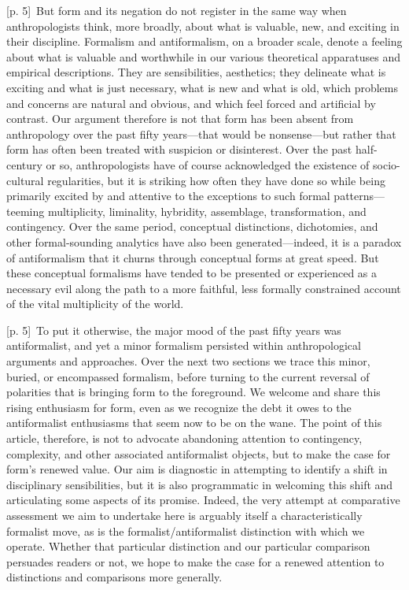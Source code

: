 \documentclass[10pt,a4paper]{article}
\begin{document}
{\scriptsize\color{gray} [p. 5]}\ But form and its negation do not register in the same way when anthropologists think, more broadly, about what is valuable, new, and exciting in their discipline. Formalism and antiformalism, on a broader scale, denote a feeling about what is valuable and worthwhile in our various theoretical apparatuses and empirical descriptions. They are sensibilities, aesthetics; they delineate what is exciting and what is just necessary, what is new and what is old, which problems and concerns are natural and obvious, and which feel forced and artificial by contrast. Our argument therefore is not that form has been absent from anthropology over the past fifty years—that would be nonsense—but rather that form has often been treated with suspicion or disinterest. Over the past half-century or so, anthropologists have of course acknowledged the existence of socio-cultural regularities, but it is striking how often they have done so while being primarily excited by and attentive to the exceptions to such formal patterns—teeming multiplicity, liminality, hybridity, assemblage, transformation, and contingency. Over the same period, conceptual distinctions, dichotomies, and other formal-sounding analytics have also been generated—indeed, it is a paradox of antiformalism that it churns through conceptual forms at great speed. But these conceptual formalisms have tended to be presented or experienced as a necessary evil along the path to a more faithful, less formally constrained account of the vital multiplicity of the world.\par
{\scriptsize\color{gray} [p. 5]}\ To put it otherwise, the major mood of the past fifty years was antiformalist, and yet a minor formalism persisted within anthropological arguments and approaches. Over the next two sections we trace this minor, buried, or encompassed formalism, before turning to the current reversal of polarities that is bringing form to the foreground. We welcome and share this rising enthusiasm for form, even as we recognize the debt it owes to the antiformalist enthusiasms that seem now to be on the wane. The point of this article, therefore, is not to advocate abandoning attention to contingency, complexity, and other associated antiformalist objects, but to make the case for form’s renewed value. Our aim is diagnostic in attempting to identify a shift in disciplinary sensibilities, but it is also programmatic in welcoming this shift and articulating some aspects of its promise. Indeed, the very attempt at comparative assessment we aim to undertake here is arguably itself a characteristically formalist move, as is the formalist/antiformalist distinction with which we operate. Whether that particular distinction and our particular comparison persuades readers or not, we hope to make the case for a renewed attention to distinctions and comparisons more generally.\par
\end{document}
